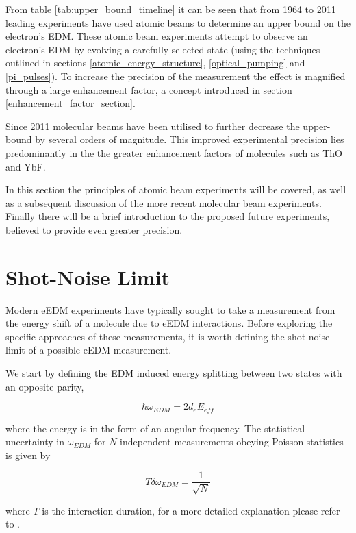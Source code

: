 From table \ref{tab:upper_bound_timeline} it can be seen that from 1964 to 2011 leading experiments have used atomic beams to determine an upper bound on the electron's EDM. These atomic beam experiments attempt to observe an electron's EDM by evolving a carefully selected state (using the techniques outlined in sections \ref{atomic_energy_structure}, \ref{optical_pumping} and \ref{pi_pulses}). To increase the precision of the measurement the effect is magnified through a large enhancement factor, a concept introduced in section \ref{enhancement_factor_section}.

Since 2011 molecular beams have been utilised to further decrease the upper-bound by several orders of magnitude. This improved experimental precision lies predominantly in the the greater enhancement factors of molecules such as ThO and YbF.

In this section the principles of atomic beam experiments will be covered, as well as a subsequent discussion of the more recent molecular beam experiments. Finally there will be a brief introduction to the proposed future experiments, believed to provide even greater precision.

\section{Shot-Noise Limit}
\label{general_precision_considerations}

Modern eEDM experiments have typically sought to take a measurement from the energy shift of a molecule due to eEDM interactions. Before exploring the specific approaches of these measurements, it is worth defining the shot-noise limit of a possible eEDM measurement.

We start by defining the EDM induced energy splitting between two states with an opposite parity, 

\begin{equation} \label{edm_anglular_frequency_splitting}
    \hbar \omega_{EDM} = 2 d_e E_{eff}
\end{equation}

where the energy is in the form of an angular frequency. The statistical uncertainty in $\omega_{EDM}$ for $N$ independent measurements obeying Poisson statistics is given by

\begin{equation} \label{edm_SNR}
    T \delta \omega_{EDM} = \frac{1}{\sqrt{N}}
\end{equation}

where $T$ is the interaction duration, for a more detailed explanation please refer to \cite{Vutha_2010}.

